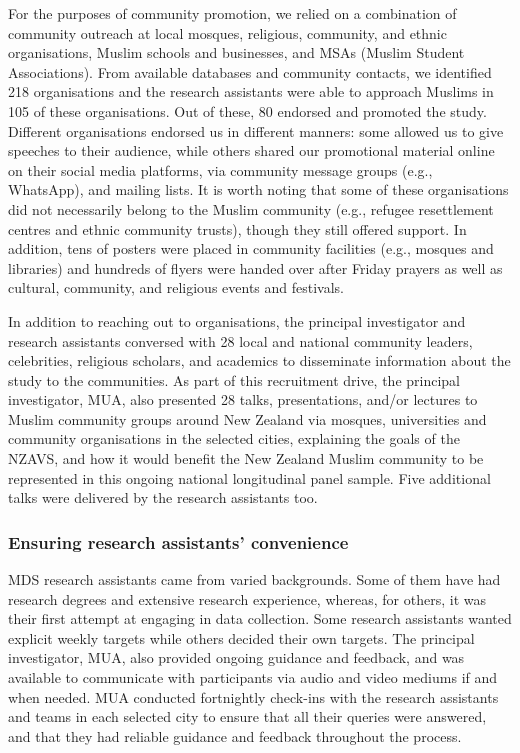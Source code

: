 \documentclass[
]{interact}
\begin{document}
For the purposes of community promotion, we relied on a combination of
community outreach at local mosques, religious, community, and ethnic
organisations, Muslim schools and businesses, and MSAs (Muslim Student
Associations). From available databases and community contacts, we
identified 218 organisations and the research assistants were able to
approach Muslims in 105 of these organisations. Out of these, 80
endorsed and promoted the study. Different organisations endorsed us in
different manners: some allowed us to give speeches to their audience,
while others shared our promotional material online on their social
media platforms, via community message groups (e.g., WhatsApp), and
mailing lists. It is worth noting that some of these organisations did
not necessarily belong to the Muslim community (e.g., refugee
resettlement centres and ethnic community trusts), though they still
offered support. In addition, tens of posters were placed in community
facilities (e.g., mosques and libraries) and hundreds of flyers were
handed over after Friday prayers as well as cultural, community, and
religious events and festivals.

In addition to reaching out to organisations, the principal investigator
and research assistants conversed with 28 local and national community
leaders, celebrities, religious scholars, and academics to disseminate
information about the study to the communities. As part of this
recruitment drive, the principal investigator, MUA, also presented 28
talks, presentations, and/or lectures to Muslim community groups around
New Zealand via mosques, universities and community organisations in the
selected cities, explaining the goals of the NZAVS, and how it would
benefit the New Zealand Muslim community to be represented in this
ongoing national longitudinal panel sample. Five additional talks were
delivered by the research assistants too.

\subsubsection{Ensuring research assistants'
convenience}\label{ensuring-research-assistants-convenience}

MDS research assistants came from varied backgrounds. Some of them have
had research degrees and extensive research experience, whereas, for
others, it was their first attempt at engaging in data collection. Some
research assistants wanted explicit weekly targets while others decided
their own targets. The principal investigator, MUA, also provided
ongoing guidance and feedback, and was available to communicate with
participants via audio and video mediums if and when needed. MUA
conducted fortnightly check-ins with the research assistants and teams
in each selected city to ensure that all their queries were answered,
and that they had reliable guidance and feedback throughout the process.
\end{document}

